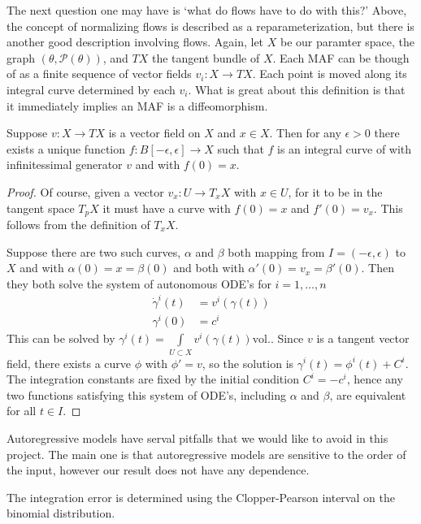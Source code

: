 The next question one may have is `what do flows have to do with this?' Above, the concept of normalizing flows is described as a reparameterization, but there is another good description involving flows. Again, let $X$ be our paramter space, the graph $(\theta,\mathcal{P}(\theta))$, and $TX$ the tangent bundle of $X$. Each MAF can be though of as a finite sequence of vector fields $v_i:X \rightarrow TX$. Each point is moved along its integral curve determined by each $v_i$. What is great about this definition is that it immediately implies an MAF is a diffeomorphism. 
\begin{prop}
Suppose $v:X \rightarrow TX$ is a vector field on $X$ and $x \in X$. Then for any $\epsilon>0$ there exists a unique function $f:B[-\epsilon,\epsilon]\rightarrow X$ such that $f$ is an integral curve of with infinitessimal generator $v$ and with $f(0) = x$.  
\end{prop}
\begin{proof}
Of course, given a vector $v_x:U\rightarrow T_x X$ with $x\in U$, for it to be in the tangent space $T_pX$ it must have a curve with $f(0)=x$ and $f'(0)=v_x$. This follows from the definition of $T_xX$.

Suppose there are two such curves, $\alpha$ and $\beta$ both mapping from $I=(-\epsilon,\epsilon)$ to $X$ and with $\alpha(0) = x = \beta(0)$ and both with $\alpha'(0) = v_x = \beta'(0)$. Then they both solve the system of autonomous ODE's for $i=1,\dots,n$
\begin{equation}
\begin{split}
	\dot{\gamma}^i(t) &= v^i(\gamma(t)) \\
	\gamma^i(0) &= c^i
\end{split}
\end{equation}
This can be solved by $\gamma^i(t) = \int\limits_{U\subset X}v^i(\gamma(t))\text{vol.}$. Since $v$ is a tangent vector field, there exists a curve $\phi$ with $\phi' = v$, so the solution is $\gamma^i(t) = \phi^i(t)+C^i$. The integration constants are fixed by the initial condition $C^i=-c^i$, hence any two functions satisfying this system of ODE's, including $\alpha$ and $\beta$, are equivalent for all $t\in I$.
\end{proof}

Autoregressive models have serval pitfalls that we would like to avoid in this project. The main one is that autoregressive models are sensitive to the order of the input, however our result does not have any dependence. 

The integration error is determined using the Clopper-Pearson interval on the binomial distribution.